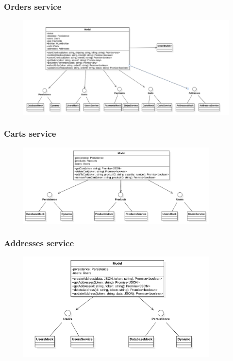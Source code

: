 \subsubsection{Orders service}
\begin{figure}[H]
    \includegraphics[width=\textwidth]{res/images/class-diagrams/orders.png}
\end{figure}

\subsubsection{Carts service}
\begin{figure}[H]
    \includegraphics[width=0.9\textwidth]{res/images/class-diagrams/carts.png}
\end{figure}

\subsubsection{Addresses service}
\begin{figure}[H]
    \includegraphics[width=0.9\textwidth]{res/images/class-diagrams/addresses.png}
\end{figure}

